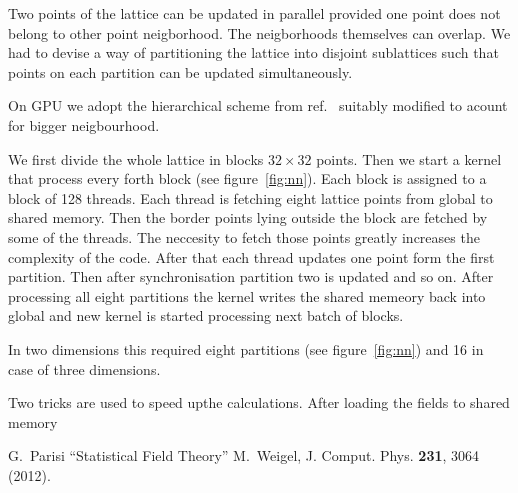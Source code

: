 \documentclass[a4paper]{llncs}
\begin{document}
Two points of the lattice can be updated in parallel provided one
point does not belong to other point neigborhood. The neigborhoods
themselves can overlap.  We had to devise a way of partitioning the
lattice into disjoint sublattices such that points on each partition
can be updated simultaneously. 

On GPU we adopt the hierarchical scheme from
ref.~\cite{weigel} suitably modified to acount for bigger neigbourhood. 

We first divide the whole lattice in blocks $32\times 32$
points. Then we start a kernel that process every forth block (see
figure~\ref{fig:nn}).  Each block is assigned to a block of 128
threads. Each thread is fetching eight lattice points from global to
shared memory. Then the border points lying outside the block are
fetched by some of the threads. The neccesity to fetch those points
greatly increases the complexity of the code. After that each thread
updates one point form the first partition. Then after
synchronisation partition two is updated and so on. After processing
all eight partitions the kernel writes the shared memeory back into
global and new kernel is started processing next batch of blocks.

In two dimensions this required eight partitions (see
figure~\ref{fig:nn}) and 16 in case of three dimensions.



Two tricks are used to speed upthe calculations. After loading the
fields to shared memory 


\begin{thebibliography}{9}
 G.~Parisi ``Statistical Field Theory'' 
 M.~Weigel, J. Comput. Phys. \textbf{231}, 3064 (2012).
\end{thebibliography}
\end{document}
